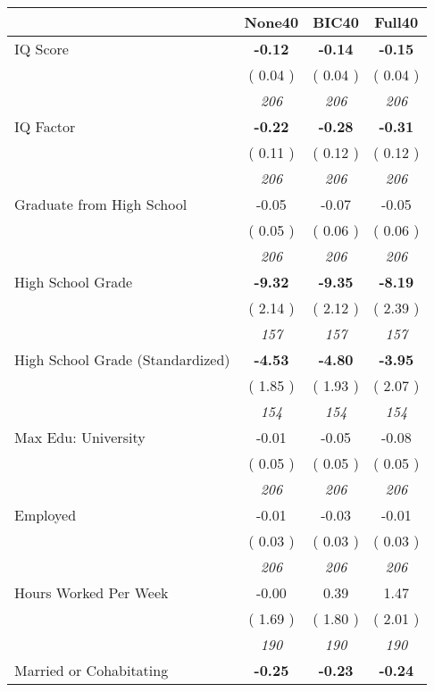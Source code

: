 \begin{tabular}{l c c c}
\toprule
 & None40 & BIC40 & Full40 \\
\midrule
IQ Score & \textbf{     -0.12 } & \textbf{     -0.14 } & \textbf{     -0.15 } \\
& (     0.04 ) & (     0.04 ) & (     0.04 ) \\
& \textit{ 206 } & \textit{ 206 } & \textit{ 206 } \\
IQ Factor & \textbf{     -0.22 } & \textbf{     -0.28 } & \textbf{     -0.31 } \\
& (     0.11 ) & (     0.12 ) & (     0.12 ) \\
& \textit{ 206 } & \textit{ 206 } & \textit{ 206 } \\
Graduate from High School &     -0.05 &     -0.07 &     -0.05 \\
& (     0.05 ) & (     0.06 ) & (     0.06 ) \\
& \textit{ 206 } & \textit{ 206 } & \textit{ 206 } \\
High School Grade & \textbf{     -9.32 } & \textbf{     -9.35 } & \textbf{     -8.19 } \\
& (     2.14 ) & (     2.12 ) & (     2.39 ) \\
& \textit{ 157 } & \textit{ 157 } & \textit{ 157 } \\
High School Grade (Standardized) & \textbf{     -4.53 } & \textbf{     -4.80 } & \textbf{     -3.95 } \\
& (     1.85 ) & (     1.93 ) & (     2.07 ) \\
& \textit{ 154 } & \textit{ 154 } & \textit{ 154 } \\
Max Edu: University &     -0.01 &     -0.05 &     -0.08 \\
& (     0.05 ) & (     0.05 ) & (     0.05 ) \\
& \textit{ 206 } & \textit{ 206 } & \textit{ 206 } \\
Employed &     -0.01 &     -0.03 &     -0.01 \\
& (     0.03 ) & (     0.03 ) & (     0.03 ) \\
& \textit{ 206 } & \textit{ 206 } & \textit{ 206 } \\
Hours Worked Per Week &     -0.00 &      0.39 &      1.47 \\
& (     1.69 ) & (     1.80 ) & (     2.01 ) \\
& \textit{ 190 } & \textit{ 190 } & \textit{ 190 } \\
Married or Cohabitating & \textbf{     -0.25 } & \textbf{     -0.23 } & \textbf{     -0.24 } \\

\end{tabular}
